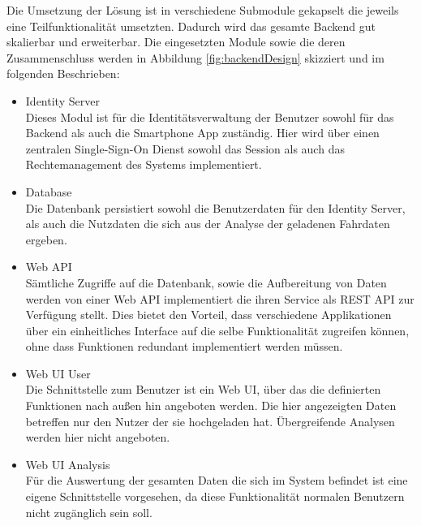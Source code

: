 Die Umsetzung der Lösung ist in verschiedene Submodule gekapselt die jeweils eine Teilfunktionalität umsetzten. Dadurch wird das gesamte Backend gut skalierbar und erweiterbar. Die eingesetzten Module sowie die deren Zusammenschluss werden in Abbildung \ref{fig:backendDesign} skizziert und im folgenden Beschrieben:

\begin{itemize}
\item Identity Server \\
Dieses Modul ist für die Identitätsverwaltung der Benutzer sowohl für das Backend als auch die Smartphone App zuständig. Hier wird über einen zentralen Single-Sign-On Dienst sowohl das Session als auch das Rechtemanagement des Systems implementiert.
\item Database \\
Die Datenbank persistiert sowohl die Benutzerdaten für den Identity Server, als auch die Nutzdaten die sich aus der Analyse der geladenen Fahrdaten ergeben. 
\item Web API \\
Sämtliche Zugriffe auf die Datenbank, sowie die Aufbereitung von Daten werden von einer Web API implementiert die ihren Service als REST API zur Verfügung stellt. Dies bietet den Vorteil, dass verschiedene Applikationen über ein einheitliches Interface auf die selbe Funktionalität zugreifen können, ohne dass Funktionen redundant implementiert werden müssen.
\item Web UI User \\
Die Schnittstelle zum Benutzer ist ein Web UI, über das die definierten Funktionen nach außen hin angeboten werden. Die hier angezeigten Daten betreffen nur den Nutzer der sie hochgeladen hat. Übergreifende Analysen werden hier nicht angeboten.
\item Web UI Analysis \\
Für die Auswertung der gesamten Daten die sich im System befindet ist eine eigene Schnittstelle vorgesehen, da diese Funktionalität normalen Benutzern nicht zugänglich sein soll. 
\end{itemize}



